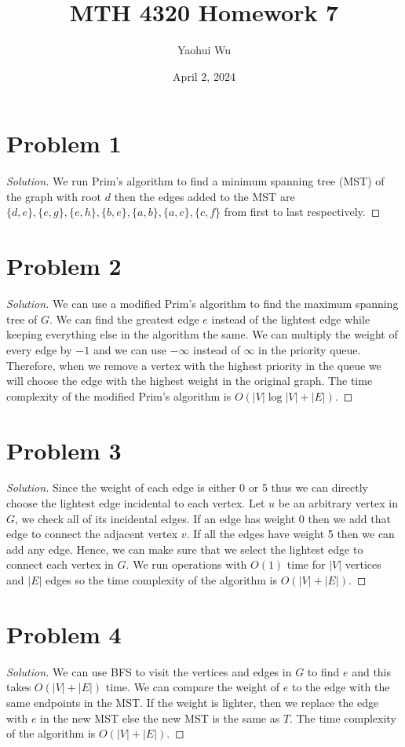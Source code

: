 \documentclass[12pt]{article}
\title{MTH 4320 Homework 7}
\author{Yaohui Wu}
\date{April 2, 2024}
\newenvironment*{solution}{\begin{proof}[Solution]}{\end{proof}}
\begin{document}
\maketitle
\section*{Problem 1}
\begin{solution}
    We run Prim's algorithm to find a minimum spanning tree (MST) of the graph
    with root \(d\) then the edges added to the MST are \(\{d,e\},\{e,g\},\{e,
    h\},\{b,e\},\{a,b\},\{a,c\},\{c,f\}\) from first to last respectively.
\end{solution}
\section*{Problem 2}
\begin{solution}
    We can use a modified Prim's algorithm to find the maximum spanning tree
    of \(G\). We can find the greatest edge \(e\) instead of the lightest edge
    while keeping everything else in the algorithm the same. We can multiply
    the weight of every edge by \(-1\) and we can use \(-\infty\) instead of
    \(\infty\) in the priority queue. Therefore, when we remove a vertex with
    the highest priority in the queue we will choose the edge with the highest
    weight in the original graph. The time complexity of the modified Prim's
    algorithm is \(O(|V|\log|V|+|E|)\).
\end{solution}
\section*{Problem 3}
\begin{solution}
    Since the weight of each edge is either 0 or 5 thus we can directly choose
    the lightest edge incidental to each vertex. Let \(u\) be an arbitrary
    vertex in \(G\), we check all of its incidental edges. If an edge has
    weight 0 then we add that edge to connect the adjacent vertex \(v\). If
    all the edges have weight 5 then we can add any edge. Hence, we can make
    sure that we select the lightest edge to connect each vertex in \(G\). We
    run operations with \(O(1)\) time for \(|V|\) vertices and \(|E|\) edges
    so the time complexity of the algorithm is \(O(|V|+|E|)\).
\end{solution}
\section*{Problem 4}
\begin{solution}
    We can use BFS to visit the vertices and edges in \(G\) to find \(e\) and
    this takes \(O(|V|+|E|)\) time. We can compare the weight of \(e\) to the
    edge with the same endpoints in the MST. If the weight is lighter, then we
    replace the edge with \(e\) in the new MST else the new MST is the same as
    \(T\). The time complexity of the algorithm is \(O(|V|+|E|)\).
\end{solution}
\end{document}
